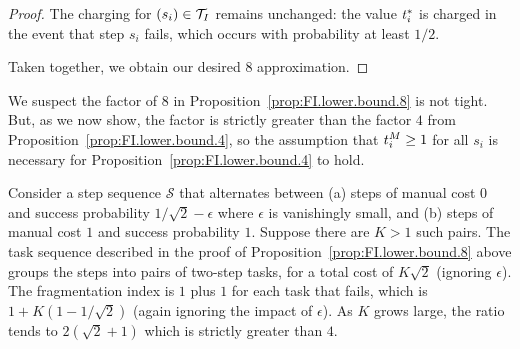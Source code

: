 \begin{proof}
    The charging for $(s_i) \in \mathcal{T}_I$ remains unchanged: the value $t^*_{i}$ is charged in the event that step $s_i$ fails, which occurs with probability at least $1/2$.

    Taken together, we obtain our desired $8$ approximation.
\end{proof}

We suspect the factor of $8$ in Proposition~\ref{prop:FI.lower.bound.8} is not tight. 
But, as we now show, the factor is strictly greater than the factor $4$ from Proposition~\ref{prop:FI.lower.bound.4}, so the assumption that $t^{M}_{i} \geq 1$ for all $s_i$ is necessary for Proposition~\ref{prop:FI.lower.bound.4} to hold.

\begin{example}
\label{ex:FI.approx.not.4}
Consider a step sequence $\mathcal{S}$ that alternates between (a) steps of manual cost $0$ and success probability $1/\sqrt{2} - \epsilon$ where $\epsilon$ is vanishingly small, and (b) steps of manual cost $1$ and success probability $1$.  
Suppose there are $K > 1$ such pairs.  
The task sequence described in the proof of Proposition~\ref{prop:FI.lower.bound.8} above groups the steps into pairs of two-step tasks, for a total cost of $K \sqrt{2}$ (ignoring $\epsilon$).  
The fragmentation index is $1$ plus $1$ for each task that fails, which is $1 + K(1 - 1/\sqrt{2})$ (again ignoring the impact of $\epsilon$).  
As $K$ grows large, the ratio tends to $2(\sqrt{2}+1)$ which is strictly greater than $4$.
\end{example}

